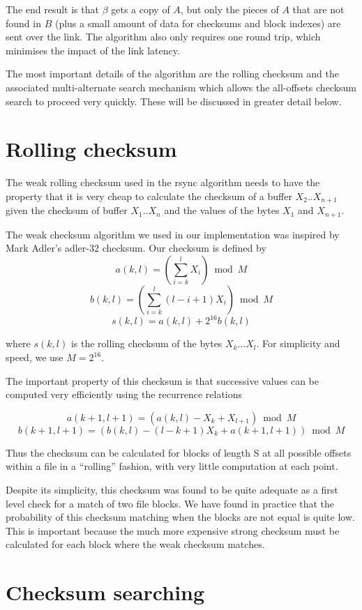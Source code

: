 \documentclass[a4paper]{article}
\begin{document}
The end result is that $\beta$ gets a copy of $A$, but only the pieces
of $A$ that are not found in $B$ (plus a small amount of data for
checksums and block indexes) are sent over the link. The algorithm
also only requires one round trip, which minimises the impact of the
link latency.

The most important details of the algorithm are the rolling checksum
and the associated multi-alternate search mechanism which allows the
all-offsets checksum search to proceed very quickly. These will be
discussed in greater detail below.

\section{Rolling checksum}

The weak rolling checksum used in the rsync algorithm needs to have
the property that it is very cheap to calculate the checksum of a
buffer $X_2 .. X_{n+1}$ given the checksum of buffer $X_1 .. X_n$ and
the values of the bytes $X_1$ and $X_{n+1}$.

The weak checksum algorithm we used in our implementation was inspired
by Mark Adler's adler-32 checksum.  Our checksum is defined by
$$ a(k,l) = (\sum_{i=k}^l X_i) \bmod M $$
$$ b(k,l) = (\sum_{i=k}^l (l-i+1)X_i) \bmod M $$
$$ s(k,l) = a(k,l) + 2^{16} b(k,l) $$

where $s(k,l)$ is the rolling checksum of the bytes $X_k \ldots X_l$.
For simplicity and speed, we use $M = 2^{16}$.  

The important property of this checksum is that successive values can
be computed very efficiently using the recurrence relations

$$ a(k+1,l+1) = (a(k,l) - X_k + X_{l+1}) \bmod M $$
$$ b(k+1,l+1) = (b(k,l) - (l-k+1) X_k + a(k+1,l+1)) \bmod M $$

Thus the checksum can be calculated for blocks of length S at all
possible offsets within a file in a ``rolling'' fashion, with very
little computation at each point.

Despite its simplicity, this checksum was found to be quite adequate as
a first level check for a match of two file blocks.  We have found in
practice that the probability of this checksum matching when the
blocks are not equal is quite low.  This is important because the much
more expensive strong checksum must be calculated for each block where
the weak checksum matches.

\section{Checksum searching}
\end{document}
